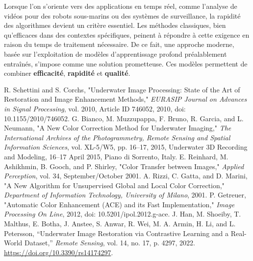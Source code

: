 \documentclass[10pt, a4paper]{extarticle}
\numberwithin{equation}{section}
\numberwithin{figure}{section}
\begin{document}
\vspace{3mm}

\par Lorsque l’on s’oriente vers des applications en temps réel, comme l’analyse de vidéos pour des robots sous-marins ou des systèmes de surveillance, la rapidité des algorithmes devient un critère essentiel. Les méthodes classiques, bien qu'efficaces dans des contextes spécifiques, peinent à répondre à cette exigence en raison du temps de traitement nécessaire. De ce fait, une approche moderne, basée sur l’exploitation de modèles d’apprentissage profond préalablement entraînés, s’impose comme une solution prometteuse. Ces modèles permettent de combiner \textbf{efficacité}, \textbf{rapidité} et \textbf{qualité}.


\newpage
\listoffigures
{}
\newpage
\begin{thebibliography}{99}
\begin{doublespace}
 R. Schettini and S. Corchs, "Underwater Image Processing: State of the Art of Restoration and Image Enhancement Methods," \textit{EURASIP Journal on Advances in Signal Processing}, vol. 2010, Article ID 746052, 2010, doi: 10.1155/2010/746052.
 G. Bianco, M. Muzzupappa, F. Bruno, R. Garcia, and L. Neumann, "A New Color Correction Method for Underwater Imaging," \textit{The International Archives of the Photogrammetry, Remote Sensing and Spatial Information Sciences}, vol. XL-5/W5, pp. 16–17, 2015, Underwater 3D Recording and Modeling, 16–17 April 2015, Piano di Sorrento, Italy.
 E. Reinhard, M. Ashikhmin, B. Gooch, and P. Shirley, "Color Transfer between Images," \textit{Applied Perception}, vol. 34, September/October 2001.
 A. Rizzi, C. Gatta, and D. Marini, "A New Algorithm for Unsupervised Global and Local Color Correction," \textit{Department of Information Technology, University of Milano}, 2001.
 P. Getreuer, "Automatic Color Enhancement (ACE) and its Fast Implementation," \textit{Image Processing On Line}, 2012, doi: 10.5201/ipol.2012.g-ace.
 J. Han, M. Shoeiby, T. Malthus, E. Botha, J. Anstee, S. Anwar, R. Wei, M. A. Armin, H. Li, and L. Petersson, ``Underwater Image Restoration via Contrastive Learning and a Real-World Dataset,'' \textit{Remote Sensing}, vol. 14, no. 17, p. 4297, 2022. \url{https://doi.org/10.3390/rs14174297}.

  
\end{doublespace}   
\end{thebibliography}
\end{document}
